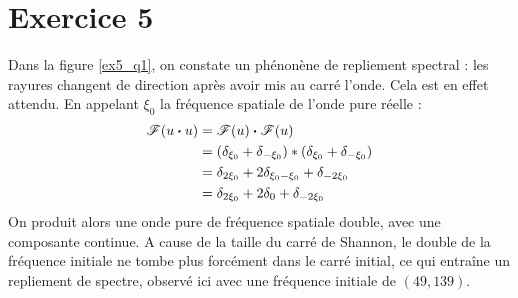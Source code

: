 \documentclass[12pt,a4paper,onecolumn]{article}
\begin{document}
\section*{Exercice 5}

Dans la figure \ref{ex5_q1}, on constate un phénonène de repliement spectral : les rayures changent de direction après avoir mis au carré l'onde. Cela est en effet attendu. En appelant $\xi_0$ la fréquence spatiale de l'onde pure réelle :
\begin{align*}
\mathscr{F}(u \dotproduct u) &= \mathscr{F}(u) \dotproduct \mathscr{F}(u) \\
& = (\delta_{\xi_0} + \delta_{-\xi_0}) * (\delta_{\xi_0} + \delta_{-\xi_0})\\
& = \delta_{2\xi_0} + 2\delta_{\xi_0 - \xi_0} + \delta_{-2\xi_0}\\
& = \delta_{2\xi_0} +  2\delta_0 + \delta_{-2\xi_0}
\end{align*}
On produit alors une onde pure de fréquence spatiale double, avec une composante continue. A cause de la taille du carré de Shannon, le double de la fréquence initiale ne tombe plus forcément dans le carré initial, ce qui entraîne un repliement de spectre, observé ici avec une fréquence initiale de $(49, 139)$.
\end{document}
